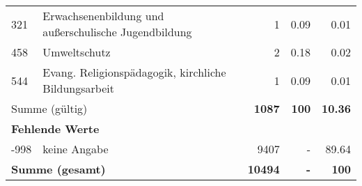 \begin{longtable}{lXrrr}
        321 & \multicolumn{1}{X}{Erwachsenenbildung und außerschulische Jugendbildung} & %
          \num{1} &
          \num[round-mode=places,round-precision=2]{0,09} &
          \num[round-mode=places,round-precision=2]{0,01} \\

        458 & \multicolumn{1}{X}{Umweltschutz} & %
          \num{2} &
          \num[round-mode=places,round-precision=2]{0,18} &
          \num[round-mode=places,round-precision=2]{0,02} \\

        544 & \multicolumn{1}{X}{Evang. Religionspädagogik, kirchliche Bildungsarbeit} & %
          \num{1} &
          \num[round-mode=places,round-precision=2]{0,09} &
          \num[round-mode=places,round-precision=2]{0,01} \\

     \midrule
     \multicolumn{2}{l}{Summe (gültig)} &
       \textbf{\num{1087}} &
     \textbf{100} &
       \textbf{\num[round-mode=places,round-precision=2]{10,36}} \\
     \multicolumn{5}{l}{\textbf{Fehlende Werte}}\\
       -998 &
       keine Angabe &
         \num{9407} &
        - &
         \num[round-mode=places,round-precision=2]{89,64} \\
     \midrule
     \multicolumn{2}{l}{\textbf{Summe (gesamt)}} &
          \textbf{\num{10494}} &
        \textbf{-} &
        \textbf{100} \\
     \bottomrule
     \end{longtable}
     
